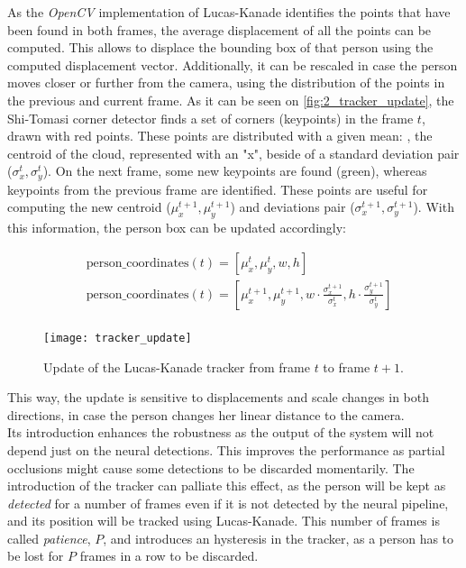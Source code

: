As the \textit{OpenCV} implementation of Lucas-Kanade identifies the points that have been found in both frames, the average displacement of all the points can be computed. This allows to displace the bounding box of that person using the computed displacement vector. Additionally, it can be rescaled in case the person moves closer or further from the camera, using the distribution of the points in the previous and current frame. As it can be seen on \autoref{fig:2_tracker_update}, the Shi-Tomasi corner detector finds a set of corners (keypoints) in the frame $t$, drawn with red points. These points are distributed with a given mean: , the centroid of the cloud, represented with an "x", beside of a standard deviation pair ($\sigma_x^t, \sigma_y^t$). On the next frame, some new keypoints are found (green), whereas keypoints from the previous frame are identified. These points are useful for computing the new centroid ($\mu_x^{t+1}, \mu_y^{t+1}$) and deviations pair ($\sigma_x^{t+1}, \sigma_y^{t+1}$). With this information, the person box can be updated accordingly:

\begin{align*}
&\text{person\_coordinates}(t) = \left[\mu_x^{t}, \mu_y^{t}, w, h\right]\\
&\text{person\_coordinates}(t) = \left[\mu_x^{t+1}, \mu_y^{t+1}, w\cdot\frac{\sigma_x^{t+1}}{\sigma_x^t}, h\cdot\frac{\sigma_y^{t+1}}{\sigma_y^t}\right]\\
\end{align*}

\begin{figure}[h]
	\centering
	\texttt{[image: tracker\_update]}
	\caption{Update of the Lucas-Kanade tracker from frame $t$ to frame $t+1$.}
	\label{fig:2_tracker_update}
\end{figure}

This way, the update is sensitive to displacements and scale changes in both directions, in case the person changes her linear distance to the camera.\\



Its introduction enhances the robustness as the output of the system will not depend just on the neural detections. This improves the performance as partial occlusions might cause some detections to be discarded momentarily. The introduction of the tracker can palliate this effect, as the person will be kept as \textit{detected} for a number of frames even if it is not detected by the neural pipeline, and its position will be tracked using Lucas-Kanade. This number of frames is called \textit{patience}, $P$, and introduces an hysteresis in the tracker, as a person has to be lost for $P$ frames in a row to be discarded.\\



